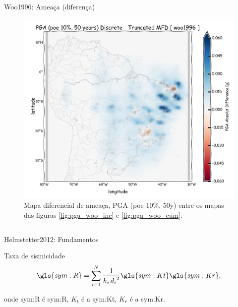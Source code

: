 \documentclass[ucs,8pt]{beamer}
\begin{document}
\begin{frame}{Woo1996: Ameaça (diferença)}
\begin{figure}[H]
	\centering
		\includegraphics[height=0.95\textheight]{pga_woo_dif} 
		\caption{Mapa diferencial de ameaça, PGA (poe 10\%, 50y)
		   entre os mapas das figuras 
		   \ref{fig:pga_woo_inc} e \ref{fig:pga_woo_cum}.}
		\label{fig:pga_woo_dif} 
\end{figure}
\end{frame}



\subsection{\citet{helmstetter_2012}}

\begin{frame}{Helmstetter2012: Fundamentos}
	\begin{block}{Taxa de sismicidade}
		\begin{equation}
			\ensuremath{\gls{sym:R} = \sum_{i=1}^{N}{ \frac{1}{h_i\,{d_i}^2} \gls{sym:Kt}\gls{sym:Kr} }},
			\label{eq:helms01}
		\end{equation}
	\end{block}
	onde \gls{sym:R} é \glsdesc{sym:R}, 
		  $K_t$ é a \glsdesc{sym:Kt}, 
		  $K_r$ é a \glsdesc{sym:Kr}.
\end{frame}
\end{document}
